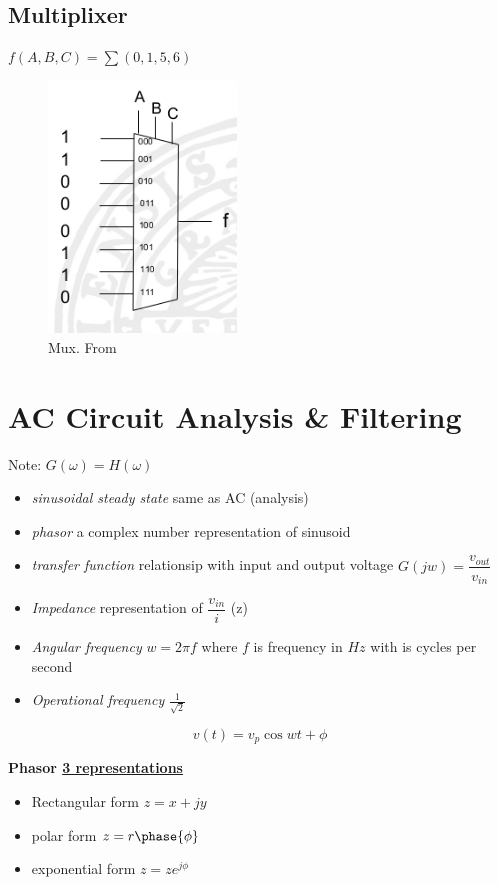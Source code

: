 \subsection{Multiplixer}
$f(A,B,C)=\sum(0,1,5,6)$
\begin{figure}[h]
    \centering
    \includegraphics[width=5cm]{image/mux.png}
    \caption{Mux. From \cite{}}
\end{figure}


\newpage
\section{AC Circuit Analysis \& Filtering}
Note: $G(\omega)=H(\omega)$

\begin{itemize}
    \item \textit{sinusoidal steady state} same as AC (analysis)
    \item \textit{phasor} a complex number representation of sinusoid 
    \item \textit{transfer function} relationsip with input and output voltage $G(jw)=\dfrac{v_{out}}{v_{in}}$
    \item \textit{Impedance} representation of $\dfrac{v_{in}}{i}$ (z)
    \item \textit{Angular frequency} $w=2\pi f$ where $f$ is frequency in $Hz$ with is cycles per second
    \item \textit{Operational frequency} $\frac{1}{\sqrt{2}}$
\end{itemize}

\begin{equation}
    v(t)=v_p\cos{wt+\phi}
\end{equation}

\textbf{Phasor \underline{3 representations}}
\begin{itemize}
    \item Rectangular form $z=x+jy$
    \item polar form $z=r \phase{\phi}$
    \item exponential form $z=ze^{j\phi}$
\end{itemize}

